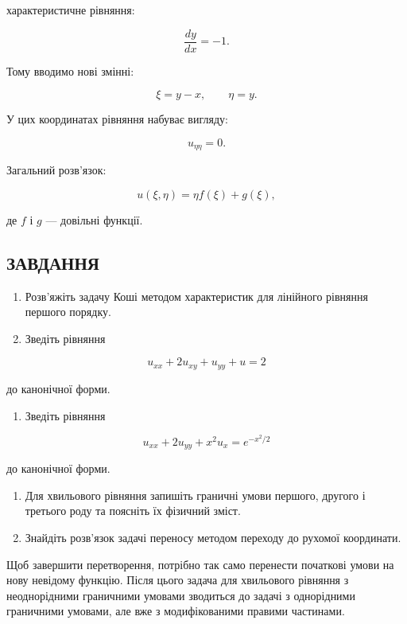 \documentclass[
  ukrainian,
]{article}
\providecommand{\tightlist}{%
  \setlength{\itemsep}{0pt}\setlength{\parskip}{0pt}}
\begin{document}
характеристичне рівняння:

\[
\frac{dy}{dx} = -1.
\]

Тому вводимо нові змінні:

\[
\xi = y - x, \qquad \eta = y.
\]

У цих координатах рівняння набуває вигляду:

\[
u_{\eta\eta} = 0.
\]

Загальний розв'язок:

\[
u(\xi,\eta) = \eta f(\xi) + g(\xi),
\]

де \(f\) і \(g\) --- довільні функції.

\subsection{ЗАВДАННЯ}\label{ux437ux430ux432ux434ux430ux43dux43dux44f-13}

\begin{enumerate}
\def\labelenumi{\arabic{enumi}.}
\item
  Розв'яжіть задачу Коші методом характеристик для лінійного рівняння
  першого порядку.
\item
  Зведіть рівняння
\end{enumerate}

\[
u_{xx} + 2u_{xy} + u_{yy} + u = 2
\]

до канонічної форми.

\begin{enumerate}
\def\labelenumi{\arabic{enumi}.}
\setcounter{enumi}{2}
\tightlist
\item
  Зведіть рівняння
\end{enumerate}

\[
u_{xx} + 2u_{yy} + x^2 u_x = e^{-x^2/2}
\]

до канонічної форми.

\begin{enumerate}
\def\labelenumi{\arabic{enumi}.}
\setcounter{enumi}{3}
\item
  Для хвильового рівняння запишіть граничні умови першого, другого і
  третього роду та поясніть їх фізичний зміст.
\item
  Знайдіть розв'язок задачі переносу методом переходу до рухомої
  координати.
\end{enumerate}

Щоб завершити перетворення, потрібно так само перенести початкові умови
на нову невідому функцію. Після цього задача для хвильового рівняння з
неоднорідними граничними умовами зводиться до задачі з однорідними
граничними умовами, але вже з модифікованими правими частинами.
\end{document}
